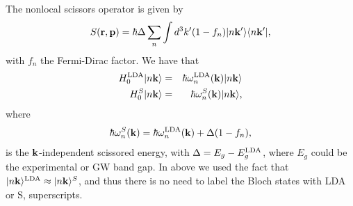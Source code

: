 \documentclass[floatfix,prb,aps,superscriptaddress,11pt,preprint]{revtex4}
\begin{document}
The nonlocal scissors operator is given by 
\begin{equation}\label{chon.0}
S(\mathbf{r},\mathbf{p})=\hbar\Delta\sum_n\int d^3k'(1-f_n) | n\mathbf{k}' \rangle\langle n\mathbf{k}' |
,
\end{equation}
with $f_n$ the Fermi-Dirac factor.
We have that
\begin{eqnarray}\label{chon.1}  
H^{\mathrm{LDA}}_0| n\mathbf{k} \rangle&=&\hbar\omega^{\mathrm{LDA}}_n(\mathbf{k})| n\mathbf{k} \rangle
\nonumber\\
H^S_0| n\mathbf{k} \rangle&=&\hbar\omega^S_n(\mathbf{k})| n\mathbf{k} \rangle
,
\end{eqnarray} 
where 
\begin{eqnarray}\label{chon.78}
\hbar\omega^S_n(\mathbf{k})=\hbar\omega^{\mathrm{LDA}}_n(\mathbf{k})+\Delta(1-f_n)
,
\end{eqnarray}
 is the $\mathbf{k}$-independent scissored
energy, with $\Delta=E_g-E_g^{\mathrm{LDA}}$, where $E_g$ could be the experimental
or GW band gap. In above we used the fact that 
$| n\mathbf{k} \rangle^{\mathrm{LDA}}\approx| n\mathbf{k} \rangle^S$, and thus there is no need to label
the Bloch states with LDA or S, superscripts. 
\end{document}
